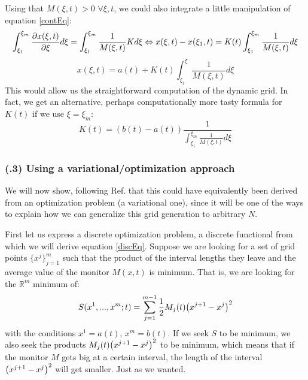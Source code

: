 \documentclass[11pt, a4paper]{article} %
\newcommand{\R}{\mathbb{R}} %
\begin{document}
Using that $M(\xi,t)>0$ $\forall \xi,t$, we could also integrate a little manipulation of equation \eqref{contEq}:
\begin{equation}
\int^{\xi_m}_{\xi_1}  \pdv{x(\xi,t)}{\xi} d\xi=\int^{\xi_m}_{\xi_1} \frac{1}{M(\xi,t)} K d \xi  \Leftrightarrow x(\xi,t)-x(\xi_1,t) =K(t)\int^{\xi_m}_{\xi_1} \frac{1}{M(\xi,t)}  d \xi
\end{equation}
\begin{equation}
x(\xi,t)=a(t)+K(t)\int^\xi_{\xi_1} \frac{1}{M(\xi,t)}d\xi
\end{equation}
This would allow us the straightforward computation of the dynamic grid. In fact, we get an alternative, perhaps computationally more tasty formula for $K(t)$ if we use $\xi=\xi_m$:
\begin{equation}
K(t)=(b(t)-a(t))\frac{1}{\int^{\xi_m}_{\xi_1} \frac{1}{M(\xi,t)}d\xi}
\end{equation}

\subsubsection*{\bf (\textgamma.3) Using a variational/optimization approach}
We will now show, following Ref.\cite{movingGrids} that this could have equivalently been derived from an optimization problem (a variational one), since it will be one of the ways to explain how we can generalize this grid generation to arbitrary $N$.

First let us express a discrete optimization problem, a discrete functional from which we will derive equation \eqref{discEq}. Suppose we are looking for a set of grid points $\{x^j \}_{j=1}^m$ such that the product of the interval lengths they leave and the average value of the monitor $M(x,t)$ is minimum. That is, we are looking for the $\R^m$ minimum of: 
\begin{equation}\label{discFunc}
S( x^1,...,x^m;t)=\sum_{j=1}^{m-1} \frac{1}{2} M_j(t) \qty(x^{j+1}-x^j)^2
\end{equation}
with the conditions $x^1=a(t)$, $x^m=b(t)$. If we seek $S$ to be minimum, we also seek the products $M_j(t) \qty(x^{j+1}-x^j)^2$ to be minimum, which means that if the monitor $M$ gets big at a certain interval, the length of the interval $\qty(x^{j+1}-x^j)^2$ will get smaller. Just as we wanted.
\end{document}
